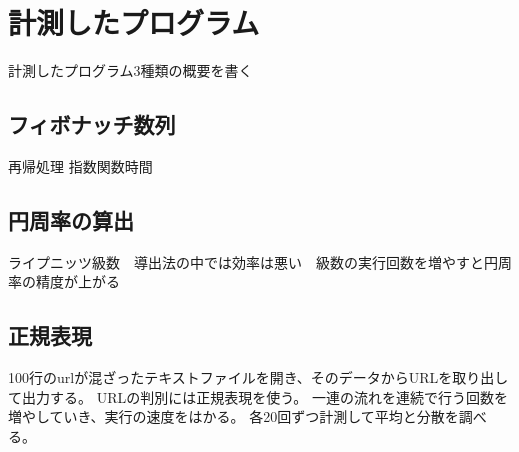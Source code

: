 \chapter{計測したプログラム}
\label{cha:program}
計測したプログラム3種類の概要を書く
\section{フィボナッチ数列}
再帰処理 指数関数時間
\section{円周率の算出}
ライプニッツ級数　導出法の中では効率は悪い　級数の実行回数を増やすと円周率の精度が上がる
\section{正規表現}
100行のurlが混ざったテキストファイルを開き、そのデータからURLを取り出して出力する。
URLの判別には正規表現を使う。
一連の流れを連続で行う回数を増やしていき、実行の速度をはかる。
各20回ずつ計測して平均と分散を調べる。
